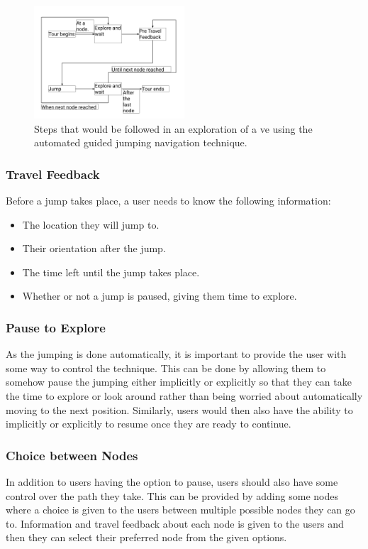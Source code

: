 \begin{figure}[]
	\centering
	\includegraphics[width=0.5\textwidth]{images/interaction-design-steps.png}
	\caption{Steps that would be followed in an exploration of a \acrshort{ve} using the automated guided jumping navigation technique.}
	\label{fig:interaction-design-steps}
\end{figure}

\subsubsection{Travel Feedback}
\label{subsubsection AGJ ID ES: Travel Feedback}
Before a jump takes place, a user needs to know the following information:
\begin{itemize}
	\item The location they will jump to.
	\item Their orientation after the jump.
	\item The time left until the jump takes place.
	\item Whether or not a jump is paused, giving them time to explore.
\end{itemize}

\subsubsection{Pause to Explore}
\label{subsubsection AGJ ID ES: Pause to Explore}
As the jumping is done automatically, it is important to provide the user with some way to control the technique. This can be done by allowing them to somehow pause the jumping either implicitly or explicitly so that they can take the time to explore or look around rather than being worried about automatically moving to the next position. Similarly, users would then also have the ability to implicitly or explicitly to resume once they are ready to continue.

\subsubsection{Choice between Nodes}
\label{subsubsection AGJ ID ES: Choice between Nodes}
In addition to users having the option to pause, users should also have some control over the path they take. This can be provided by adding some nodes where a choice is given to the users between multiple possible nodes they can go to. Information and travel feedback about each node is given to the users and then they can select their preferred node from the given options. 

